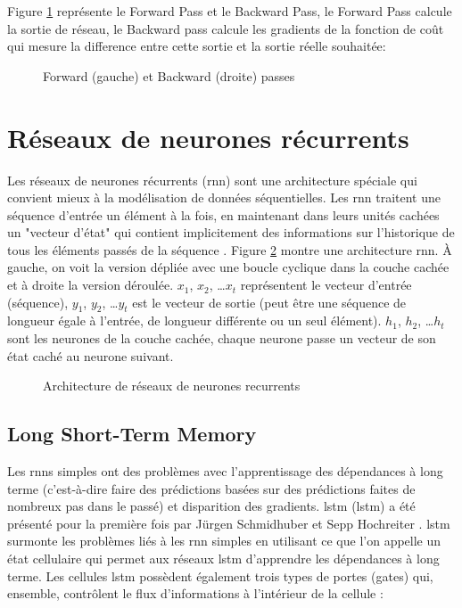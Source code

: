 Figure \ref{fig:forward-backward-pass} représente le Forward Pass et le Backward Pass, le Forward Pass calcule la sortie de réseau, le Backward pass calcule les gradients de la fonction de coût qui mesure la difference entre cette sortie et la sortie réelle souhaitée:

\begin{figure}[h]
    \centering
	
    \caption{Forward (gauche) et Backward (droite) passes}
    \label{fig:forward-backward-pass}
\end{figure}


\section{Réseaux de neurones récurrents}
Les réseaux de neurones récurrents (\acrshort{rnn}) sont une architecture spéciale qui convient mieux à la modélisation de données séquentielles. Les \acrshort{rnn} traitent une séquence d'entrée un élément à la fois, en maintenant dans leurs unités cachées un "vecteur d'état" qui contient implicitement des informations sur l'historique de tous les éléments passés de la séquence \cite{LeCun2015}. Figure \ref{fig:rnn} montre une architecture \acrshort{rnn}. À gauche, on voit la version dépliée avec une boucle cyclique dans la couche cachée et à droite la version déroulée. $x_1$, $x_2$, …$x_t$ représentent le vecteur d'entrée (séquence), $y_1$, $y_2$, …$y_t$ est le vecteur de sortie (peut être une séquence de longueur égale à l'entrée, de longueur différente ou un seul élément). $h_1$, $h_2$, …$h_t$ sont les neurones de la couche cachée, chaque neurone passe un vecteur de son état caché au neurone suivant.

\begin{figure}[H]
    \centering
    
    \caption{Architecture de réseaux de neurones recurrents}
    \label{fig:rnn}
\end{figure}

\subsection{Long Short-Term Memory}
\label{section:lstm}
Les \acrshort{rnn}s simples ont des problèmes avec l'apprentissage des dépendances à long terme (c'est-à-dire faire des prédictions basées sur des prédictions faites de nombreux pas dans le passé) et disparition des gradients. \acrlong{lstm} (\acrshort{lstm}) a été présenté pour la première fois par Jürgen Schmidhuber et Sepp Hochreiter \cite{Hochreiter1997}. \acrshort{lstm} surmonte les problèmes liés à les \acrshort{rnn} simples en utilisant ce que l'on appelle un état cellulaire qui permet aux réseaux \acrshort{lstm} d'apprendre les dépendances à long terme. Les cellules \acrshort{lstm} possèdent également trois types de portes (gates) qui, ensemble, contrôlent le flux d'informations à l'intérieur de la cellule :

